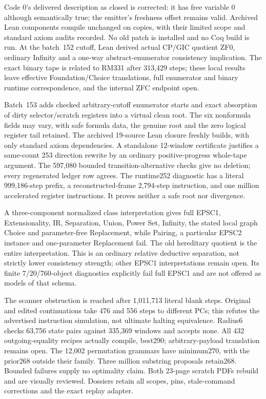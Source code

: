 \documentclass[11pt]{article}
\begin{document}
{Code 0's delivered description as closed is corrected: it has free variable 0
although semantically true; the emitter's freshness offset remains valid.
Archived Lean components compile unchanged on copies, with their limited
scope and standard axiom audits recorded. No old patch is installed and no
Coq build is run. At the batch~152 cutoff, Lean derived actual CP/GIC quotient ZF0,
ordinary Infinity and a one-way abstract-enumerator consistency implication.
The exact binary tape is related to RM331 after 313,429 steps; these local
results leave effective Foundation/Choice translations, full enumerator and
binary runtime correspondence, and the internal ZFC endpoint open.

Batch~153 adds checked arbitrary-cutoff enumerator starts and exact absorption
of dirty selector/scratch registers into a virtual clean root. The six
nonformula fields may vary, with safe formula data, the genuine root and
the zero logical register tail retained. The archived 19-source Lean closure
freshly builds, with only standard axiom dependencies. A standalone
12-window certificate justifies a same-count 253 direction rewrite by an
ordinary positive-progress whole-tape argument. The 597,080 bounded
transition-alternative checks give no deletion; every regenerated ledger
row agrees. The runtime252 diagnostic has a literal 999,186-step prefix,
a reconstructed-frame 2,794-step instruction, and one million accelerated
register instructions. It proves neither a safe root nor divergence.

A three-component normalized class interpretation gives full EPSC1,
Extensionality, IR, Separation, Union, Power Set, Infinity, the stated local
graph Choice and parameter-free Replacement, while Pairing, a particular
EPSC2 instance and one-parameter Replacement fail. The old hereditary
quotient is the entire interpretation. This is an ordinary relative
deductive separation, not strictly lower consistency strength; other EPSC1
interpretations remain open. Its finite 7/20/760-object diagnostics explicitly
fail full EPSC1 and are not offered as models of that schema.

The scanner obstruction is reached after 1,011,713 literal blank steps.
Original and edited continuations take 476 and 556 steps to different PCs;
this refutes the advertised instruction simulation, not ultimate halting
equivalence. Radius6 checks 63,756 state pairs against 335,369 windows and
accepts none. All 432 outgoing-equality recipes actually compile, best290;
arbitrary-payload translation remains open. The 12,002 permutation grammars
have minimum270, with the prior268 outside their family. Three million
substring proposals retain268. Bounded failures supply no optimality claim.
Both 23-page scratch PDFs rebuild and are visually reviewed. Dossiers retain
all scopes, pins, stale-command corrections and the exact replay adapter.

}
\end{document}
